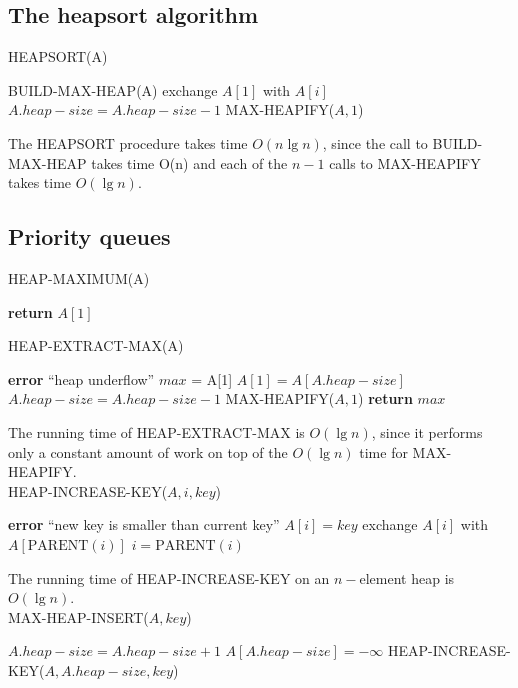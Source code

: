 \documentclass[12pt]{article}
\begin{document}
\subsection{The heapsort algorithm}

HEAPSORT(A)
\begin{algorithmic}[1]
\State BUILD-MAX-HEAP(A)
	\State exchange $A[1]$ with $A[i]$
        \State $A.heap-size = A.heap-size - 1$
	\State MAX-HEAPIFY($A, 1$)
\EndFor
\end{algorithmic}

The HEAPSORT procedure takes time $O(n \lg n)$, since the call to BUILD-MAX-HEAP takes time O(n) and each of the $n-1$ calls to MAX-HEAPIFY takes time $O(\lg n)$.

\subsection{Priority queues}

HEAP-MAXIMUM(A)
\begin{algorithmic}[1]
\State \textbf {return} $A[1]$
\end{algorithmic}

HEAP-EXTRACT-MAX(A)
\begin{algorithmic}[1]
	\State \textbf {error} ``heap underflow''
\EndIf
\State $max$ = A[1]
\State $A[1] = A[A.heap-size]$
\State $A.heap-size = A.heap-size - 1$
\State MAX-HEAPIFY($A,1$)
\State \textbf {return} $max$
\end{algorithmic}

The running time of HEAP-EXTRACT-MAX is $O(\lg n)$, since it performs only a constant amount of work on top of the $O(\lg n)$ time for MAX-HEAPIFY. \\

HEAP-INCREASE-KEY($A, i, key$)
\begin{algorithmic}[1]
	\State \textbf {error} ``new key is smaller than current key''
\EndIf
\State $A[i] = key$
	\State exchange $A[i]$ with $A[\text {PARENT}(i)]$
        \State $i = \text {PARENT}(i)$
\EndWhile
\end{algorithmic}

The running time of HEAP-INCREASE-KEY on an $n-$element heap is $O(\lg n)$. \\

MAX-HEAP-INSERT($A, key$)
\begin{algorithmic}[1]
\State $A.heap-size = A.heap-size + 1$
\State $A[A.heap-size] = -\infty$
\State HEAP-INCREASE-KEY($A, A.heap-size,key$)
\end{algorithmic}
\end{document}
